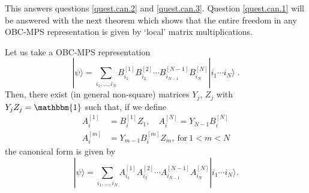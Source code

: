 \documentclass[aps,prl,epsfig,graphics,floatfix,mathbbm,a4paper]{article}
\newcommand{\1}{\mathbbm{1}}
\renewcommand{\>}{\rangle}
\newcommand{\<}{\langle}
\begin{document}
This answers questions \ref{quest.can.2} and \ref{quest.can.3}.
Question \ref{quest.can.1} will be answered with the next theorem
which shows that the entire freedom in any OBC-MPS representation
is given by `local' matrix multiplications.

\begin{theorem}\label{free-OBC}
    Let us take a OBC-MPS representation \begin{equation*}
        |\psi\rangle=\sum_{i_1,\ldots,i_N}
        B^{[1]}_{i_1}B^{[2]}_{i_2}\cdots
        B^{[N-1]}_{i_{N-1}}B^{[N]}_{i_N}|i_1\cdots i_N\rangle\;.
    \end{equation*}
    Then, there exist (in general non-square) matrices $Y_j$, $Z_j$
    with  $Y_jZ_j=\mathbbm{1}$ such that, if we define
    \begin{align}
        \nonumber A^{[1]}_i &=B^{[1]}_iZ_1,\quad  A^{[N]}_i =Y_{N-1}B^{[N]}_i\\
        A^{[m]}_i           &=Y_{m-1}B^{[m]}_iZ_m,\ \text{for}\ 1<m<N
        \label{eq.lem.II.9}
    \end{align}
    the canonical form is given by
    \begin{equation}\label{Eq:canonical2}
        |\psi\rangle=\sum_{i_1,\ldots,i_N}
        A^{[1]}_{i_1}A^{[2]}_{i_2}\cdots
        A^{[N-1]}_{i_{N-1}}A^{[N]}_{i_N}|i_1\cdots i_N\rangle.
    \end{equation}
\end{theorem}
\end{document}
